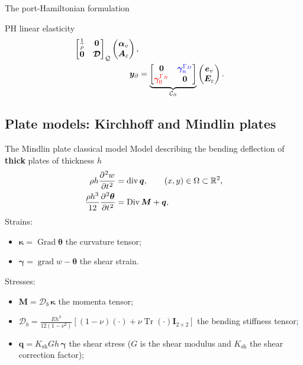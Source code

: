\documentclass[aspectratio=169]{ISAE-Beamer}
\DeclareMathOperator*{\grad}{grad}
\DeclareMathOperator*{\Grad}{Grad}
\DeclareMathOperator*{\Div}{Div}
\renewcommand{\div}{\operatorname{div}}
\DeclareMathOperator{\Tr}{Tr}
\newcommand{\bbR}{\mathbb{R}}
\begin{document}
\begin{frame}{The port-Hamiltonian formulation}
\begin{block}{PH linear elasticity}
\begin{equation*}
\begin{aligned}
{		\begin{bmatrix}
		\frac{1}{\rho} & \bm{0} \\
		\bm{0} & \bm{\mathcal{D}} \\
		\end{bmatrix}}_{\mathcal{Q}}
	\begin{pmatrix}
	\bm{\alpha}_v \\
	\bm{A}_\varepsilon
	\end{pmatrix}, \\
	\bm{y}_\partial &= \underbrace{
		\begin{bmatrix}
		\bm{0} & \textcolor{blue}{\bm\gamma_{n}^{\Gamma_D}} \\
		\textcolor{red}{\bm\gamma_0^{\Gamma_N}} & \bm{0} \\
		\end{bmatrix}}_{\mathcal{C}_\partial}
	\begin{pmatrix}
	\bm{e}_v \\
	\bm{E}_\varepsilon
	\end{pmatrix}.
	\end{aligned}
	\end{equation*}
	\end{block}
\end{frame}



\subsection{Plate models: Kirchhoff and Mindlin plates}

\begin{frame}{The Mindlin plate classical model}
Model describing the bending deflection of \textbf{thick} plates of thickness $h$
\begin{equation*}
\begin{aligned}
\rho h \diffp[2]{w}{t} &= \div \bm{q}, \qquad (x,y) \in \Omega \subset \bbR^2, \\
\frac{\rho h^3}{12} \diffp[2]{\bm{\theta}}{t} &=\Div \bm{M} + \bm{q},
\end{aligned}
\end{equation*}
Strains:
\begin{itemize}
	\item  $\bm{\kappa} = \Grad{\bm{\theta}}$ the curvature tensor;
	\item $\bm{\gamma} = \grad w - \bm{\theta}$ the shear strain.
\end{itemize}
Stresses:
\begin{itemize}
	\item $\bm{M}= \bm{\mathcal{D}}_b\,\bm{\kappa}$ the momenta tensor;
	\item $\bm{\mathcal{D}}_{b} = \frac{E h^3}{12(1-\nu^2)} \left[ (1-\nu) (\cdot) + \nu \Tr(\cdot) \bm{I}_{2\times 2} \right]$ the bending stiffness tensor;
	\item $\bm{q}= K_{\text{sh}} Gh\,\bm{\gamma}$ the shear stress ($G$ is the shear modulus and $K_{\text{sh}}$ the shear correction factor);
\end{itemize}

\end{frame}
\end{document}

